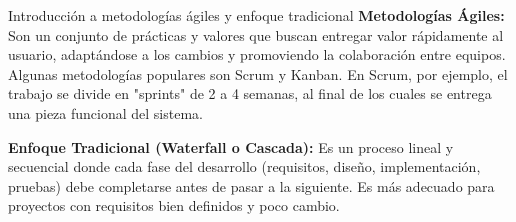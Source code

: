 \documentclass{beamer}
\begin{document}
\begin{frame}{Introducción a metodologías ágiles y enfoque tradicional}
\textbf{Metodologías Ágiles:} Son un conjunto de prácticas y valores que buscan entregar valor rápidamente al usuario, adaptándose a los cambios y promoviendo la colaboración entre equipos. Algunas metodologías populares son Scrum y Kanban. En Scrum, por ejemplo, el trabajo se divide en "sprints" de 2 a 4 semanas, al final de los cuales se entrega una pieza funcional del sistema.

\textbf{Enfoque Tradicional (Waterfall o Cascada):} Es un proceso lineal y secuencial donde cada fase del desarrollo (requisitos, diseño, implementación, pruebas) debe completarse antes de pasar a la siguiente. Es más adecuado para proyectos con requisitos bien definidos y poco cambio.
\end{frame}
\end{document}
